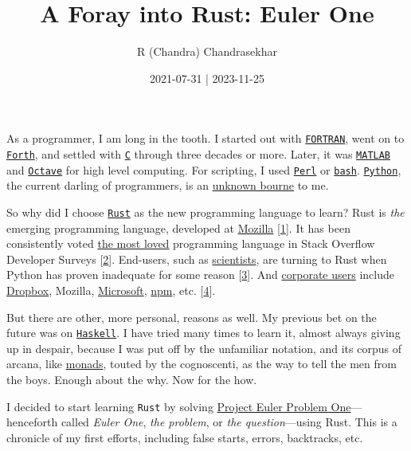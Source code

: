 \documentclass[
  a4paper,
]{article}
\title{A Foray into Rust: Euler One}
\author{R (Chandra) Chandrasekhar}
\date{2021-07-31 | 2023-11-25}
\begin{document}
\maketitle

\thispagestyle{empty}


As a programmer, I am long in the tooth. I started out with
\href{https://fortran-lang.org/}{\texttt{FORTRAN}}, went on to
\href{https://www.forth.com/}{\texttt{Forth}}, and settled with
\href{https://www.iso.org/standard/74528.html}{\texttt{C}} through three
decades or more. Later, it was
\href{https://www.mathworks.com/}{\texttt{MATLAB}} and
\href{https://www.gnu.org/software/octave/index}{\texttt{Octave}} for
high level computing. For scripting, I used
\href{https://www.perl.org/}{\texttt{Perl}} or
\href{https://www.gnu.org/software/bash/}{\texttt{bash}}.
\href{https://www.python.org/}{\texttt{Python}}, the current darling of
programmers, is an
\href{http://www.finedictionary.com/bourn.html}{unknown bourne} to me.

So why did I choose \href{https://www.rust-lang.org/}{\texttt{Rust}} as
the new programming language to learn? Rust is \emph{the} emerging
programming language, developed at
\href{https://research.mozilla.org/rust/}{Mozilla}
{[}\protect\hyperlink{ref-rust}{1}{]}. It has been consistently voted
\href{https://insights.stackoverflow.com/survey/2020\#most-loved-dreaded-and-wanted}{the
most loved} programming language in Stack Overflow Developer Surveys
{[}\protect\hyperlink{ref-goulding2020}{2}{]}. End-users, such as
\href{https://www.nature.com/articles/d41586-020-03382-2}{scientists},
are turning to Rust when Python has proven inadequate for some reason
{[}\protect\hyperlink{ref-perkel2020}{3}{]}. And
\href{https://serokell.io/blog/rust-companies}{corporate users} include
\href{https://www.dropbox.com/}{Dropbox}, Mozilla,
\href{https://www.youtube.com/watch?v=NQBVUjdkLAA}{Microsoft},
\href{https://www.npmjs.com/}{npm}, etc.
{[}\protect\hyperlink{ref-dreimanis2020}{4}{]}.

But there are other, more personal, reasons as well. My previous bet on
the future was on \href{https://www.haskell.org/}{\texttt{Haskell}}. I
have tried many times to learn it, almost always giving up in despair,
because I was put off by the unfamiliar notation, and its corpus of
arcana, like
\href{en.wikipedia.org/wiki/Monad_(functional_programming)}{monads},
touted by the cognoscenti, as the way to tell the men from the boys.
Enough about the why. Now for the how.

I decided to start learning \texttt{Rust} by solving
\href{https://projecteuler.net/problem=1}{Project Euler Problem
One}---henceforth called \emph{Euler One}, \emph{the problem}, or
\emph{the question}---using Rust. This is a chronicle of my first
efforts, including false starts, errors, backtracks, etc.
\end{document}
